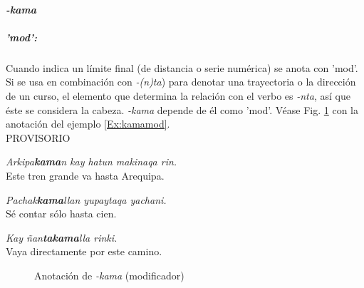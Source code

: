 \documentclass[a4paper,11pt,DIV12]{scrartcl}
\begin{document}
\paragraph{{\em -kama}}

\subparagraph{'mod':} Cuando indica un l\'imite final (de distancia o serie num\'erica) se anota con 'mod'.  
Si se usa en combinaci\'on con {\em -(n)ta}) para denotar una trayectoria o la direcci\'on de un curso, el elemento que determina la relaci\'on con el verbo es {\em -nta}, as\'i que \'este se considera la cabeza. {\em -kama} depende de \'el como 'mod'. V\'ease Fig. \ref{Fig:kamamod} con la anotaci\'on del ejemplo \ref{Ex:kamamod}.\\
PROVISORIO

\begin{examples}
\item {\em Arkipa\textbf{kama}n kay hatun makinaqa rin.}\\
      Este tren grande va hasta Arequipa.
\item {\em Pachak\textbf{kama}llan yupaytaqa yachani.}\\
      S\'e contar s\'olo hasta cien.
\item\label{Ex:kamamod} {\em Kay \~nan\textbf{takama}lla rinki.}\\
      Vaya directamente por este camino.\\
    	 \hfill{\small \citep[130]{Cusi2}}
\end{examples}

\begin{figure}
\begin{center}
 \caption{Anotaci\'on de {\em -kama} (modificador)}\label{Fig:kamamod}
\end{center}
\end{figure}
\end{document}
